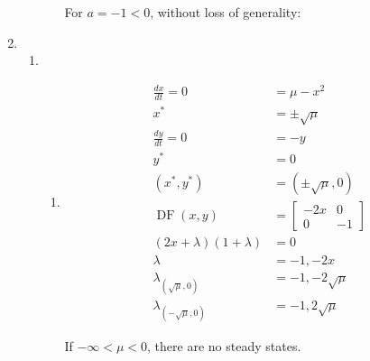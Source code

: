 \documentclass{article}
\begin{document}
\begin{enumerate}
\begin{enumerate}
\begin{enumerate}
				
				For $a = -1 < 0$, without loss of generality:
				
			\end{enumerate}
		\end{enumerate}
		\item
		\begin{enumerate}
			\item 
			\begin{enumerate}
				\item 
				\begin{equation}
					\begin{split}
						\frac{dx}{dt} = 0 & = \mu - x^2 \\
						x^* & = \pm\sqrt{\mu} \\
						\frac{dy}{dt} = 0 & = -y \\
						y^* & = 0 \\
						(x^*, y^*) & = (\pm \sqrt{\mu},0) \\
						\operatorname{DF}(x,y) & = \begin{bmatrix} -2x & 0 \\ 0 & -1\end{bmatrix} \\
						(2x + \lambda)(1 + \lambda) & = 0 \\
						\lambda & = -1,-2x \\
						\lambda_{(\sqrt{\mu},0)} & = -1,-2\sqrt{\mu} \\
						\lambda_{(-\sqrt{\mu},0)} & = -1,2\sqrt{\mu}
					\end{split}
				\end{equation}
				
				If $-\infty < \mu < 0$, there are no steady states.
				

\end{enumerate}
\end{enumerate}
\end{enumerate}
\end{document}
